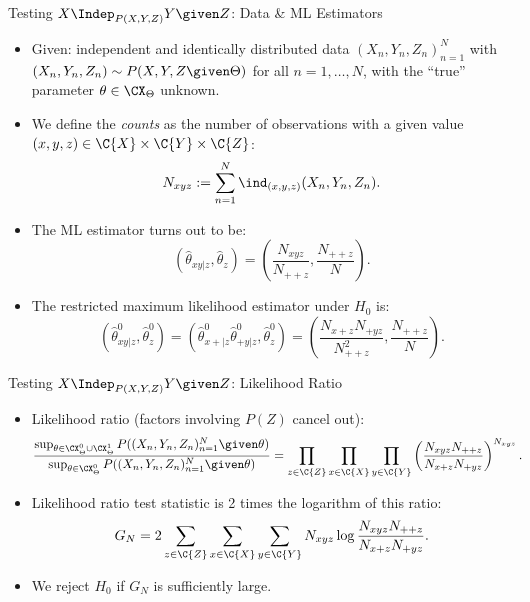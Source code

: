 \begin{frame}{Testing $X \Indep_{P(X,Y,Z)} Y \given Z$: Data \& ML Estimators}
  \begin{itemize}
    \item Given: independent and identically distributed data $(X_n,Y_n,Z_n)_{n=1}^N$ with
      $(X_n,Y_n,Z_n) \sim P(X,Y,Z \given \Theta)$ for all $n=1,\dots,N$, with the ``true'' parameter $\theta \in \CX_\Theta$
unknown.
\item We define the \emph{counts} as the number of observations with a given value $(x,y,z)\in\C{X}\times\C{Y}\times\C{Z}$:
$$N_{xyz} := \sum_{n=1}^N \ind_{(x,y,z)}(X_n,Y_n,Z_n).$$

    \item The ML estimator turns out to be:
$$\left(\hat \theta_{xy|z},\hat \theta_z\right) = \left(\frac{N_{xyz}}{N_{++ z}},\frac{N_{++ z}}{N}\right).$$
    \item The restricted maximum likelihood estimator under $H_0$ is:
$$\left(\hat \theta^0_{xy|z},\hat \theta^0_z\right) = \left(\hat \theta^0_{x+|z} \hat \theta^0_{+ y|z},\hat \theta^0_z\right) = \left(\frac{N_{x+ z} N_{+ y z}}{N_{++ z}^2},\frac{N_{++ z}}{N}\right).$$
  \end{itemize}
\end{frame}

\begin{frame}{Testing $X \Indep_{P(X,Y,Z)} Y \given Z$: Likelihood Ratio}
  \begin{itemize}
    \item Likelihood ratio (factors involving $P(Z)$ cancel out):
      \begin{equation*}\begin{split}
      \frac{\sup_{\theta\in\CX_\Theta^0\cup\CX_\Theta^1} P((X_n,Y_n,Z_n)_{n=1}^N \given \theta)}{\sup_{\theta\in\CX_\Theta^0} P((X_n,Y_n,Z_n)_{n=1}^N \given \theta)}
        & = \prod_{z\in\C{Z}} \prod_{x\in\C{X}} \prod_{y\in\C{Y}} \left(\frac{N_{xyz} N_{++ z}}{N_{x+ z} N_{+ y z}}\right)^{N_{xyz}}.
      \end{split}\end{equation*}
    \item Likelihood ratio test statistic is 2 times the logarithm of this ratio:
      \begin{equation*}
      G_N = 2 \sum_{z\in\C{Z}} \sum_{x\in\C{X}} \sum_{y\in\C{Y}} N_{xyz} \log \frac{N_{xyz} N_{+ + z}}{N_{x+ z} N_{+ y z}}.
      \end{equation*}
    \item We reject $H_0$ if $G_N$ is sufficiently large.
  \end{itemize}
\end{frame}

